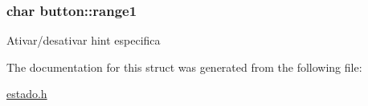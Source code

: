 \subsubsection[{\texorpdfstring{range1}{range1}}]{\setlength{\rightskip}{0pt plus 5cm}char button\+::range1}\hypertarget{structbutton_adbb6f7957d173000fd70efff43357a6e}{}\label{structbutton_adbb6f7957d173000fd70efff43357a6e}
Ativar/desativar hint especifica 

The documentation for this struct was generated from the following file\+:\begin{DoxyCompactItemize}
\item 
\hyperlink{estado_8h}{estado.\+h}\end{DoxyCompactItemize}
